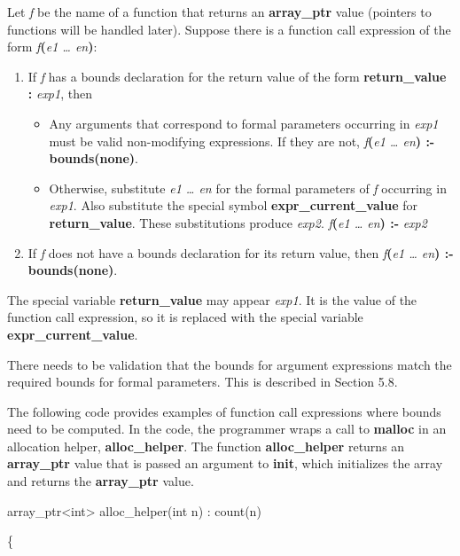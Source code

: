 \documentclass[]{article}
\begin{document}
Let \emph{f} be the name of a function that returns an
\textbf{array\_ptr} value (pointers to functions will be handled later).
Suppose there is a function call expression of the form
\emph{f}\textbf{(}\emph{e1 \ldots{} en}\textbf{)}:

\begin{enumerate}
\def\labelenumi{\arabic{enumi}.}
\item
  If \emph{f} has a bounds declaration for the return value of the form
  \textbf{return\_value :} \emph{exp1}, then

  \begin{itemize}
  \item
    Any arguments that correspond to formal parameters occurring in
    \emph{exp1} must be valid non-modifying expressions. If they are
    not, \emph{f}\textbf{(}\emph{e1 \ldots{} en}\textbf{) :-
    bounds(none)}.
  \item
    Otherwise, substitute \emph{e1 \ldots{} en} for the formal
    parameters of \emph{f} occurring in \emph{exp1}. Also substitute the
    special symbol \textbf{expr\_current\_value} for
    \textbf{return\_value}. These substitutions produce \emph{exp2}.
    \emph{f}\textbf{(}\emph{e1 \ldots{} en}\textbf{) :-} \emph{exp2}
  \end{itemize}
\item
  If \emph{f} does not have a bounds declaration for its return value,
  then \emph{f}\textbf{(}\emph{e1 \ldots{} en}\textbf{) :-
  bounds(none)}.
\end{enumerate}

The special variable \textbf{return\_value} may appear \emph{exp1}. It
is the value of the function call expression, so it is replaced with the
special variable \textbf{expr\_current\_value}.

There needs to be validation that the bounds for argument expressions
match the required bounds for formal parameters. This is described in
Section 5.8.

The following code provides examples of function call expressions where
bounds need to be computed. In the code, the programmer wraps a call to
\textbf{malloc} in an allocation helper, \textbf{alloc\_helper}. The
function \textbf{alloc\_helper} returns an \textbf{array\_ptr} value
that is passed an argument to \textbf{init}, which initializes the array
and returns the \textbf{array\_ptr} value.

array\_ptr\textless{}int\textgreater{} alloc\_helper(int n) : count(n)

\{
\end{document}
